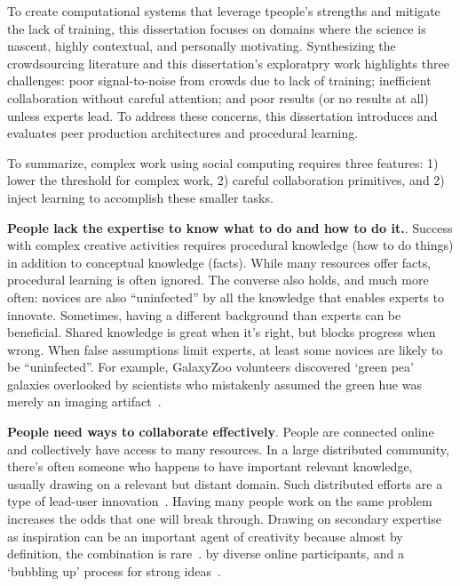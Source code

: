 To create computational systems that leverage tpeople's strengths and mitigate the lack of training, this dissertation 
focuses on domains where the science is nascent, highly contextual, and personally motivating.
 Synthesizing the crowdsourcing literature and this dissertation's exploratpry work highlights three challenges: 
poor signal-to-noise from crowds due to lack of training; inefficient collaboration without 
careful attention; and poor results (or no results at all) unless experts lead. To address  these concerns, 
this dissertation introduces and evaluates peer production architectures and procedural learning.

To summarize, complex work using social computing requires three features: 
1) lower the threshold for complex work, 2) careful collaboration primitives, and 
2) inject learning to accomplish these smaller tasks.

\textbf{People lack the expertise to know what to do and how to do it.}. 
Success with complex creative activities requires procedural
knowledge (how to do things) in addition to conceptual
knowledge (facts). While many resources offer facts, procedural
learning is often ignored. The converse also holds, and much more often: novices are also
“uninfected” by all the knowledge that enables experts to
innovate. Sometimes, having a different background than experts can
be beneficial. Shared knowledge is great when it’s right, but
blocks progress when wrong. When false assumptions limit
experts, at least some novices are likely to be “uninfected”.
For example, GalaxyZoo volunteers discovered ‘green pea’
galaxies overlooked by scientists who mistakenly assumed
the green hue was merely an imaging artifact~\cite{cardamone2009galaxy}. 


\textbf{People need ways to collaborate effectively}. 
People are connected online and collectively have access to many resources.
In a large distributed community, there’s often someone who happens to 
have important relevant knowledge, usually drawing on a relevant but 
distant domain. Such distributed efforts are a type of lead-user innovation~\cite{VonHippel2005a}. 
Having many people work on the same problem increases the odds that 
one will break through. Drawing on secondary expertise as inspiration can
 be an important agent of creativity because almost by definition, the 
combination is rare~\cite{Boden2004}. %
by diverse online participants, and a ‘bubbling up’ process for strong ideas~\cite{Yu2012}.

